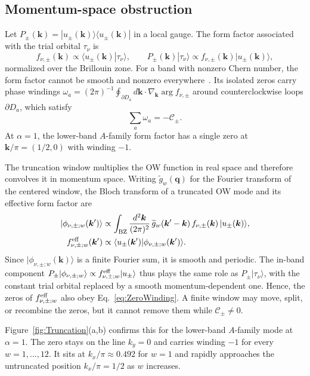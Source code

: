 \documentclass[aps,prb,10pt,twocolumn,superscriptaddress,longbibliography,floatfix]{revtex4-2}
\newcommand{\mc}[1]{\mathcal{#1}}
\newcommand{\mr}[1]{\mathrm{#1}}
\newcommand{\bs}[1]{\boldsymbol{#1}}
\newcommand{\bk}{\boldsymbol k}
\begin{document}
\subsection{Momentum-space obstruction}

Let $P_\pm(\bk)=|u_\pm(\bk)\rangle\langle u_\pm(\bk)|$ in a local gauge. The form factor associated with the trial orbital $\tau_\nu$ is
\begin{equation}
    f_{\nu,\pm}(\bk)\propto\langle u_\pm(\bk)|\tau_\nu\rangle,
    \qquad
    P_\pm(\bk)|\tau_\nu\rangle\propto f_{\nu,\pm}(\bk)|u_\pm(\bk)\rangle,
    \label{eq:FormFactor}
\end{equation}
normalized over the Brillouin zone. For a band with nonzero Chern number, the form factor cannot be smooth and nonzero everywhere~\cite{BhuiyanPanJian2026}. Its isolated zeros carry phase windings $\omega_a=(2\pi)^{-1}\oint_{\partial D_a}d\bk\cdot\nabla_{\bk}\arg f_{\nu,\pm}$ around counterclockwise loops $\partial D_a$, which satisfy
\begin{equation}
    \sum_a\omega_a=-\mc C_\pm.
    \label{eq:ZeroWinding}
\end{equation}
At $\alpha=1$, the lower-band $A$-family form factor has a single zero at $\bk/\pi=(1/2,0)$ with winding $-1$.

The truncation window multiplies the OW function in real space and therefore convolves it in momentum space. Writing $\widetilde g_w(\bs q)$ for the Fourier transform of the centered window, the Bloch transform of a truncated OW mode and its effective form factor are
\begin{align}
    |\phi_{\nu,\pm;w}(\bk')\rangle&\propto\int_{\mr{BZ}}\frac{d^2\bk}{(2\pi)^2}\,\widetilde g_w(\bk'-\bk)\,f_{\nu,\pm}(\bk)\,|u_\pm(\bk)\rangle,\nonumber\\
    f^{\rm eff}_{\nu,\pm;w}(\bk')&\propto\langle u_\pm(\bk')|\phi_{\nu,\pm;w}(\bk')\rangle.
    \label{eq:EffectiveFormFactor}
\end{align}
Since $|\phi_{\nu,\pm;w}(\bk)\rangle$ is a finite Fourier sum, it is smooth and periodic. The in-band component $P_\pm|\phi_{\nu,\pm;w}\rangle\propto f^{\rm eff}_{\nu,\pm;w}|u_\pm\rangle$ thus plays the same role as $P_\pm|\tau_\nu\rangle$, with the constant trial orbital replaced by a smooth momentum-dependent one. Hence, the zeros of $f^{\rm eff}_{\nu,\pm;w}$ also obey Eq.~\eqref{eq:ZeroWinding}. A finite window may move, split, or recombine the zeros, but it cannot remove them while $\mc C_\pm\neq0$.

Figure~\ref{fig:Truncation}(a,b) confirms this for the lower-band $A$-family mode at $\alpha=1$. The zero stays on the line $k_y=0$ and carries winding $-1$ for every $w=1,\ldots,12$. It sits at $k_x/\pi\approx0.492$ for $w=1$ and rapidly approaches the untruncated position $k_x/\pi=1/2$ as $w$ increases.
\end{document}
